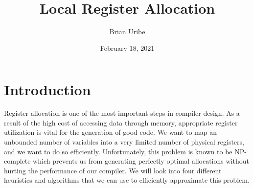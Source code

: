 \documentclass[12pt,letterpaper,oneside,draft]{article}
\begin{document}
\title{Local Register Allocation}
\author{Brian Uribe}
\date{February 18, 2021}
\maketitle
\section{Introduction}
Register allocation is one of the most important steps in compiler design. As a result of 
the high cost of accessing data through memory, appropriate register utilization is vital
for the generation of good code. We want to map an unbounded number of variables into a 
very limited number of physical registers, and we want to do so efficiently. Unfortunately,
this problem is known to be NP-complete which prevents us from generating perfectly optimal
allocations without hurting the performance of our compiler. We will look into four different
heuristics and algorithms that we can use to efficiently approximate this problem.
\end{document}
